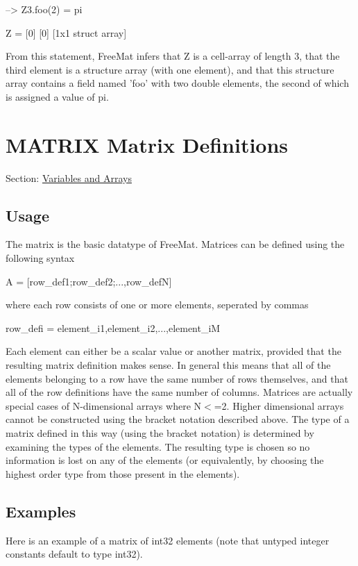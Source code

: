 \begin{DoxyVerbInclude}
--> Z{3}.foo(2) = pi

Z = 
 [0] [0] [1x1 struct array] 
\end{DoxyVerbInclude}


From this statement, Free\-Mat infers that Z is a cell-\/array of length 3, that the third element is a structure array (with one element), and that this structure array contains a field named 'foo' with two double elements, the second of which is assigned a value of pi. \hypertarget{variables_matrix}{}\section{M\-A\-T\-R\-I\-X Matrix Definitions}\label{variables_matrix}
Section\-: \hyperlink{sec_variables}{Variables and Arrays} \hypertarget{vtkwidgets_vtkxyplotwidget_Usage}{}\subsection{Usage}\label{vtkwidgets_vtkxyplotwidget_Usage}
The matrix is the basic datatype of Free\-Mat. Matrices can be defined using the following syntax \begin{DoxyVerb}  A = [row_def1;row_def2;...,row_defN]
\end{DoxyVerb}
 where each row consists of one or more elements, seperated by commas \begin{DoxyVerb}  row_defi = element_i1,element_i2,...,element_iM
\end{DoxyVerb}
 Each element can either be a scalar value or another matrix, provided that the resulting matrix definition makes sense. In general this means that all of the elements belonging to a row have the same number of rows themselves, and that all of the row definitions have the same number of columns. Matrices are actually special cases of N-\/dimensional arrays where {\ttfamily N$<$=2}. Higher dimensional arrays cannot be constructed using the bracket notation described above. The type of a matrix defined in this way (using the bracket notation) is determined by examining the types of the elements. The resulting type is chosen so no information is lost on any of the elements (or equivalently, by choosing the highest order type from those present in the elements). \hypertarget{variables_matrix_Examples}{}\subsection{Examples}\label{variables_matrix_Examples}
Here is an example of a matrix of {\ttfamily int32} elements (note that untyped integer constants default to type {\ttfamily int32}).


